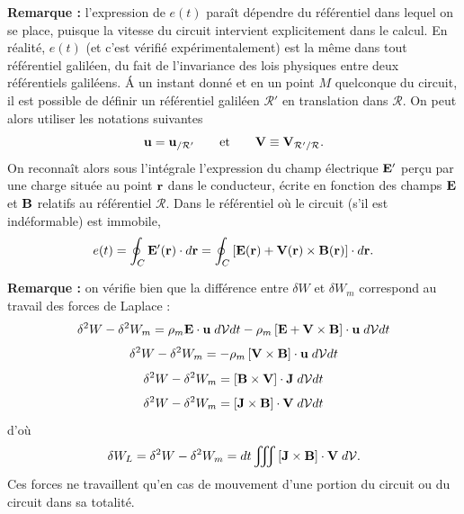 \documentclass[11pt,a4paper]{report}
\begin{document}
\textbf{Remarque :} l'expression de $e(t)$ paraît dépendre du référentiel dans lequel on se place, puisque la vitesse du circuit intervient explicitement dans le calcul. En réalité, $e(t)$ (et c'est vérifié expérimentalement) est la même dans tout référentiel galiléen, du fait de l'invariance des lois physiques entre deux référentiels galiléens. \'A un instant donné et en un point $M$ quelconque du circuit, il est possible de définir un référentiel galiléen $\mathcal{R'}$ en translation dans $\mathcal{R}$. On peut alors utiliser les notations suivantes
\begin{equation}
	\bold{u} = \bold{u}_{/\mathcal{R}'} \qquad\text{et}\qquad \bold{V} \equiv \bold{V}_{\mathcal{R}'/\mathcal{R}}.
\end{equation}
On reconnaît alors sous l'intégrale l'expression du champ électrique $\bold{E}'$ perçu par une charge située au point $\bold{r}$ dans le conducteur, écrite en fonction des champs $\bold{E}$ et $\bold{B}$ relatifs au référentiel $\mathcal{R}$. Dans le référentiel où le circuit (s'il est indéformable) est immobile,
\begin{equation}
	e(t) = \oint_C \bold{E}'(\bold{r})\cdot d\bold{r} = \oint_C\left[\bold{E}(\bold{r}) + \bold{V}(\bold{r})\times\bold{B}(\bold{r})\right]\cdot d\bold{r}.
\end{equation} 

\textbf{Remarque :} on vérifie bien que la différence entre $\delta W$ et $\delta W_m$ correspond au travail des forces de Laplace :
\begin{equation}
	\delta^2 W - \delta^2 W_m = \rho_m \bold{E}\cdot\bold{u}\;d\mathcal{V}dt - \rho_m 					\left[\bold{E}+\bold{V}\times\bold{B}\right]\cdot\bold{u}\;d\mathcal{V}dt
\end{equation}
\begin{equation}
	\delta^2 W - \delta^2 W_m = - \rho_m \left[\bold{V}\times\bold{B}\right]\cdot\bold{u}\;d\mathcal{V}dt
\end{equation}
\begin{equation}
	\delta^2 W - \delta^2 W_m = \left[\bold{B}\times\bold{V}\right]\cdot\bold{J}\;d\mathcal{V}dt
\end{equation}
\begin{equation}
	\delta^2 W - \delta^2 W_m = \left[\bold{J}\times\bold{B}\right]\cdot\bold{V}\;d\mathcal{V}dt
\end{equation}
d'où 
\begin{equation}
	\delta W_L = \delta^2 W - \delta^2 W_m = dt\iiint \left[\bold{J}\times\bold{B}\right]\cdot\bold{V}\;d\mathcal{V}.
\end{equation}
Ces forces ne travaillent qu'en cas de mouvement d'une portion du circuit ou du circuit dans sa totalité.	
\end{document}
